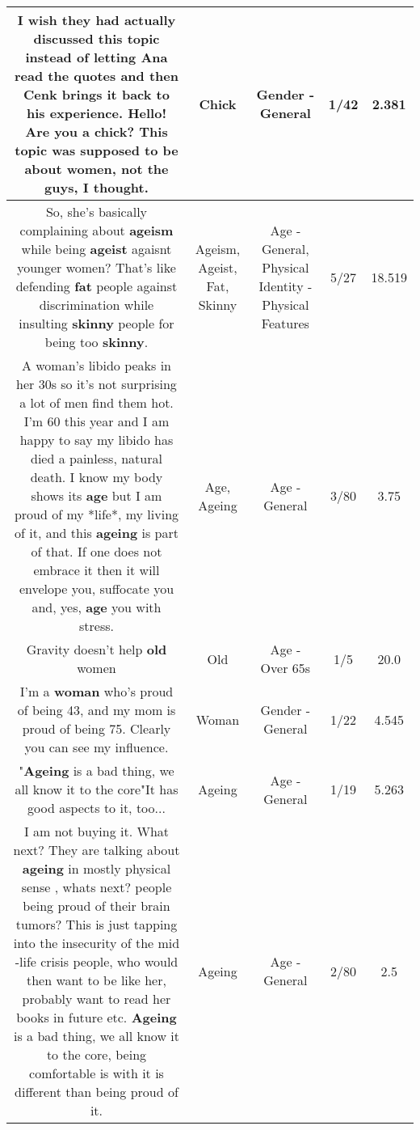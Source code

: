 \documentclass[11pt]{article}
\newlength\mylength
\begin{document}
\begin{center}
\begin{longtable}{|C{.65\mylength}|C{.30\mylength}|C{.12\mylength}|C{.12\mylength}|C{.12\mylength}|}
  \small I wish they had actually discussed this topic instead of letting Ana read the quotes and then Cenk brings it back to his experience.  Hello!  Are you a \textbf{chick}? This topic was supposed to be about women, not the guys, I thought.\normalsize   & Chick & Gender - General & 1/42 & 2.381 \\  \hline
  \small So, she's basically complaining about \textbf{ageism} while being \textbf{ageist} agaisnt younger women? That's like defending \textbf{fat} people against discrimination while insulting \textbf{skinny} people for being too \textbf{skinny}.\normalsize   & Ageism, Ageist, Fat, Skinny & Age - General, Physical Identity - Physical Features & 5/27 & 18.519 \\  \hline
  \small A woman's libido peaks in her 30s so it's not surprising a lot of men find them hot. I'm 60 this year and I am happy to say my libido has died a painless, natural death. I know my body shows its \textbf{age} but I am proud of my *life*, my living of it, and this \textbf{ageing} is part of that. If one does not embrace it then it will envelope you, suffocate you and, yes, \textbf{age} you with stress.\normalsize   & Age, Ageing & Age - General & 3/80 & 3.75 \\  \hline
  \small Gravity doesn't help \textbf{old} women\normalsize   & Old & Age - Over 65s & 1/5 & 20.0 \\  \hline
  \small I'm a \textbf{woman} who's proud of being 43, and my mom is proud of being 75. Clearly you can see my influence.\normalsize   & Woman & Gender - General & 1/22 & 4.545 \\  \hline
  \small "\textbf{Ageing} is a bad thing, we all know it to the core"It has good aspects to it, too...\normalsize   & Ageing & Age - General & 1/19 & 5.263 \\  \hline
  \small I am not buying it. What next? They are talking about \textbf{ageing} in mostly physical sense , whats next? people being proud of their brain tumors? This is just tapping into the insecurity of the mid -life crisis people, who would then want to be like her, probably want to read her books in future etc. \textbf{Ageing} is a bad thing, we all know it to the core, being comfortable is with it is different than being proud of it.\normalsize   & Ageing & Age - General & 2/80 & 2.5 \\  \hline

\end{longtable}
\end{center}
\end{document}
